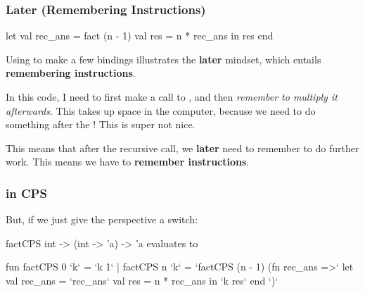 \documentclass[aspectratio=169, handout]{beamer}
\begin{document}
\begin{frame}[fragile]
  \frametitle{Later (Remembering Instructions)}

  \begin{codeblock}
    let
      val rec_ans = fact (n - 1)
      val res = n * rec_ans
    in
      res
    end
  \end{codeblock}

  Using  to make a few bindings illustrates the \textbf{later} mindset,
  which entails \textbf{remembering instructions}.

  \pause
  \vspace{\fill}

  In this code, I need to first make a call to , and then
  \textit{remember to multiply it afterwards}. This takes up space in the computer,
  because we need to do something after the ! This is super not nice.

  \pause
  \vspace{\fill}

  This means that after the recursive call, we \textbf{later} need to remember to
  do further work. This means we have to \textbf{remember instructions}.
\end{frame}

\begin{frame}[fragile]
  \frametitle{ in CPS}

  But, if we just give the perspective a switch:

  \pause
  \vspace{\fill}

  \spec
    {factCPS}
    {int -> (int -> 'a) -> 'a}
    {}
    { evaluates to }

  \pause
  \vspace{\fill}

  {\small
  \begin{codeblock}
    fun factCPS 0 `k` = `k 1`
      | factCPS n `k` =
        `factCPS (n - 1) (fn rec_ans =>`
          let
            val rec_ans = `rec_ans`
            val res = n * rec_ans
          in
            `k res`
          end
        `)`
  \end{codeblock}
  }
\end{frame}
\end{document}
